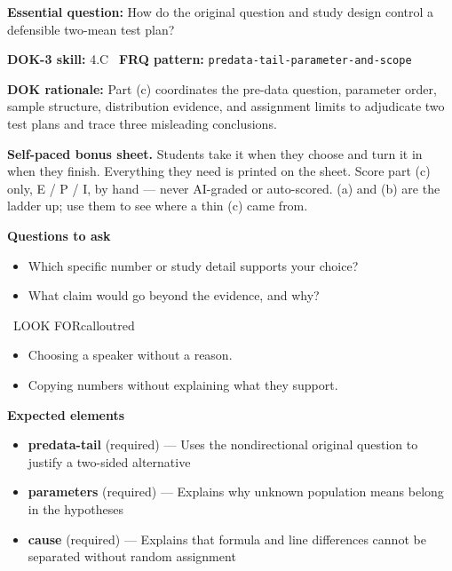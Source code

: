 \documentclass[11pt]{article}
\begin{document}
\textbf{Essential question:} How do the original question and study design control a defensible two-mean test plan?\par
\textbf{DOK-3 skill:} 4.C \textperiodcentered\ \textbf{FRQ pattern:} {\small\texttt{predata-\allowbreak{}tail-\allowbreak{}parameter-\allowbreak{}and-\allowbreak{}scope}}\par
\textbf{DOK rationale:} Part (c) coordinates the pre-data question, parameter order, sample structure, distribution evidence, and assignment limits to adjudicate two test plans and trace three misleading conclusions.\par

\textbf{Self-paced bonus sheet.} Students take it when they choose and turn it in when they finish. Everything they need is printed on the sheet. Score part (c) only, E / P / I, by hand --- never AI-graded or auto-scored. (a) and (b) are the ladder up; use them to see where a thin (c) came from.\par

\textbf{Questions to ask}
\begin{itemize}[leftmargin=1.5em,itemsep=2pt,topsep=2pt]
  \item Which specific number or study detail supports your choice?
  \item What claim would go beyond the evidence, and why?
\end{itemize}

\begin{callout}{\IconWarn\ LOOK FOR}{calloutred}
\begin{itemize}[leftmargin=1.5em,itemsep=2pt,topsep=2pt]
  \item Choosing a speaker without a reason.
  \item Copying numbers without explaining what they support.
\end{itemize}
\end{callout}


\textbf{Expected elements}
\begin{itemize}[leftmargin=1.5em,itemsep=2pt,topsep=2pt]
  \item \textbf{predata-tail} (required) --- Uses the nondirectional original question to justify a two-sided alternative
  \item \textbf{parameters} (required) --- Explains why unknown population means belong in the hypotheses
  \item \textbf{cause} (required) --- Explains that formula and line differences cannot be separated without random assignment
\end{itemize}
\end{document}
